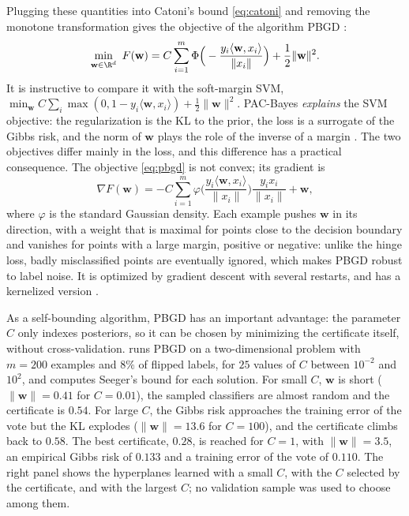 Plugging these quantities into Catoni's bound \eqref{eq:catoni} and removing
the monotone transformation gives the objective of the algorithm PBGD
\citep{germain2009pac}:
\begin{equation}\label{eq:pbgd}
\min_{\mathbf w\in\R^d}\ F(\mathbf w)=C\sum_{i=1}^m\Phi\Big(-\frac{y_i\langle\mathbf w,x_i\rangle}{\|x_i\|}\Big)+\frac12\|\mathbf w\|^2.
\end{equation}
It is instructive to compare it with the soft-margin SVM,
$\min_{\mathbf w}C\sum_i\max(0,1-y_i\langle\mathbf w,x_i\rangle)+\frac12\|\mathbf w\|^2$.
PAC-Bayes \emph{explains} the SVM objective: the regularization is the KL to the
prior, the loss is a surrogate of the Gibbs risk, and the norm of $\mathbf w$
plays the role of the inverse of a margin \citep{langford2002pac,mcallester2003simplified}.
The two objectives differ mainly in the loss, and this difference has a
practical consequence. The objective \eqref{eq:pbgd} is not convex; its gradient is
\[
\nabla F(\mathbf w)=-C\sum_{i=1}^m\varphi\Big(\frac{y_i\langle\mathbf w,x_i\rangle}{\|x_i\|}\Big)\frac{y_ix_i}{\|x_i\|}+\mathbf w,
\]
where $\varphi$ is the standard Gaussian density. Each example pushes $\mathbf w$
in its direction, with a weight that is maximal for points close to the decision
boundary and vanishes for points with a large margin, positive or negative:
unlike the hinge loss, badly misclassified points are eventually ignored, which
makes PBGD robust to label noise. It is optimized by gradient descent with
several restarts, and has a kernelized version \citep{germain2009pac}.

\begin{example}
As a self-bounding algorithm, PBGD has an important advantage: the parameter $C$
only indexes posteriors, so it can be chosen by minimizing the certificate
itself, without cross-validation.  runs PBGD on a two-dimensional
problem with $m=200$ examples and $8\%$ of flipped labels, for $25$ values of $C$
between $10^{-2}$ and $10^2$, and computes Seeger's bound for each solution. For
small $C$, $\mathbf w$ is short ($\|\mathbf w\|=0.41$ for $C=0.01$), the sampled
classifiers are almost random and the certificate is $0.54$. For large $C$, the
Gibbs risk approaches the training error of the vote but the KL explodes
($\|\mathbf w\|=13.6$ for $C=100$), and the certificate climbs back to $0.58$. The
best certificate, $0.28$, is reached for $C=1$, with $\|\mathbf w\|=3.5$, an
empirical Gibbs risk of $0.133$ and a training error of the vote of $0.110$. The
right panel shows the hyperplanes learned with a small $C$, with the $C$ selected
by the certificate, and with the largest $C$; no validation sample was used to
choose among them.
\end{example}

